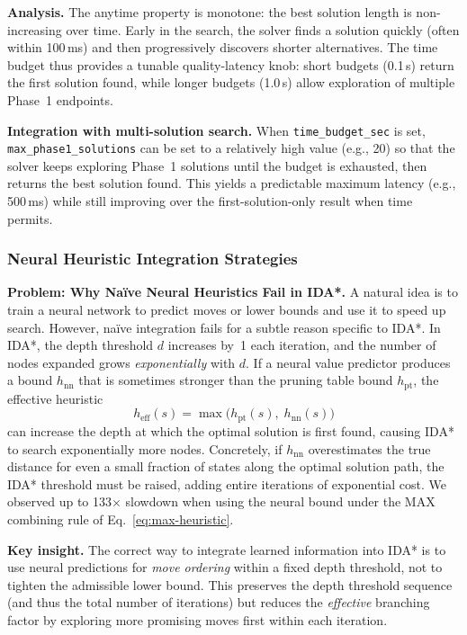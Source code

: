 \documentclass[10pt,twocolumn,a4paper]{article}
\begin{document}
\textbf{Analysis.} The anytime property is monotone: the best solution length is non-increasing over time. Early in the search, the solver finds a solution quickly (often within 100\,ms) and then progressively discovers shorter alternatives. The time budget thus provides a tunable quality-latency knob: short budgets (0.1\,s) return the first solution found, while longer budgets (1.0\,s) allow exploration of multiple Phase~1 endpoints.

\textbf{Integration with multi-solution search.} When \texttt{time\_budget\_sec} is set, \texttt{max\_phase1\_solutions} can be set to a relatively high value (e.g., 20) so that the solver keeps exploring Phase~1 solutions until the budget is exhausted, then returns the best solution found. This yields a predictable maximum latency (e.g., 500\,ms) while still improving over the first-solution-only result when time permits.

\subsubsection{Neural Heuristic Integration Strategies}
\label{sec:neural-strategies}

\textbf{Problem: Why Na\"ive Neural Heuristics Fail in IDA*.}
A natural idea is to train a neural network to predict moves or lower bounds and use it to speed up search. However, na\"ive integration fails for a subtle reason specific to IDA*. In IDA*, the depth threshold $d$ increases by~1 each iteration, and the number of nodes expanded grows \emph{exponentially} with $d$. If a neural value predictor produces a bound $h_{\mathrm{nn}}$ that is sometimes stronger than the pruning table bound $h_{\mathrm{pt}}$, the effective heuristic
\begin{equation}
h_{\text{eff}}(s) = \max\bigl(h_{\mathrm{pt}}(s),\; h_{\mathrm{nn}}(s)\bigr)
\label{eq:max-heuristic}
\end{equation}
can increase the depth at which the optimal solution is first found, causing IDA* to search exponentially more nodes. Concretely, if $h_{\mathrm{nn}}$ overestimates the true distance for even a small fraction of states along the optimal solution path, the IDA* threshold must be raised, adding entire iterations of exponential cost. We observed up to 133$\times$ slowdown when using the neural bound under the MAX combining rule of Eq.~\eqref{eq:max-heuristic}.

\textbf{Key insight.} The correct way to integrate learned information into IDA* is to use neural predictions for \emph{move ordering} within a fixed depth threshold, not to tighten the admissible lower bound. This preserves the depth threshold sequence (and thus the total number of iterations) but reduces the \emph{effective} branching factor by exploring more promising moves first within each iteration.
\end{document}
